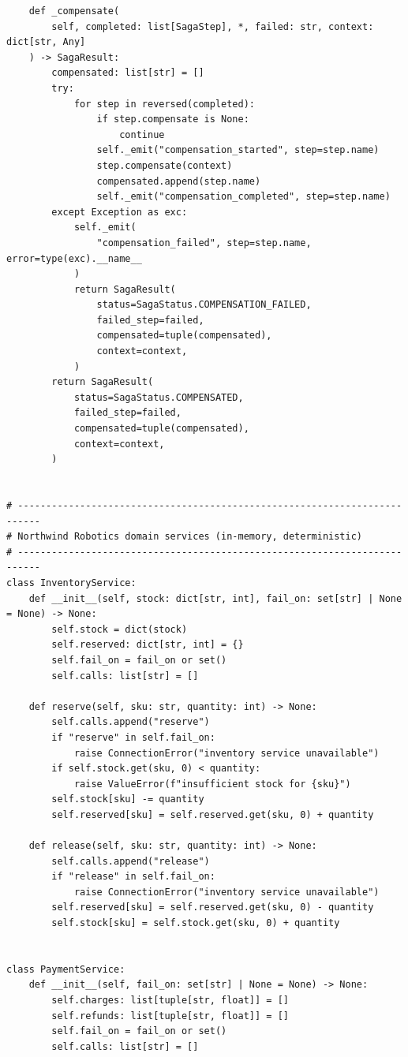 \begin{verbatim}
    def _compensate(
        self, completed: list[SagaStep], *, failed: str, context: dict[str, Any]
    ) -> SagaResult:
        compensated: list[str] = []
        try:
            for step in reversed(completed):
                if step.compensate is None:
                    continue
                self._emit("compensation_started", step=step.name)
                step.compensate(context)
                compensated.append(step.name)
                self._emit("compensation_completed", step=step.name)
        except Exception as exc:
            self._emit(
                "compensation_failed", step=step.name, error=type(exc).__name__
            )
            return SagaResult(
                status=SagaStatus.COMPENSATION_FAILED,
                failed_step=failed,
                compensated=tuple(compensated),
                context=context,
            )
        return SagaResult(
            status=SagaStatus.COMPENSATED,
            failed_step=failed,
            compensated=tuple(compensated),
            context=context,
        )


# --------------------------------------------------------------------------
# Northwind Robotics domain services (in-memory, deterministic)
# --------------------------------------------------------------------------
class InventoryService:
    def __init__(self, stock: dict[str, int], fail_on: set[str] | None = None) -> None:
        self.stock = dict(stock)
        self.reserved: dict[str, int] = {}
        self.fail_on = fail_on or set()
        self.calls: list[str] = []

    def reserve(self, sku: str, quantity: int) -> None:
        self.calls.append("reserve")
        if "reserve" in self.fail_on:
            raise ConnectionError("inventory service unavailable")
        if self.stock.get(sku, 0) < quantity:
            raise ValueError(f"insufficient stock for {sku}")
        self.stock[sku] -= quantity
        self.reserved[sku] = self.reserved.get(sku, 0) + quantity

    def release(self, sku: str, quantity: int) -> None:
        self.calls.append("release")
        if "release" in self.fail_on:
            raise ConnectionError("inventory service unavailable")
        self.reserved[sku] = self.reserved.get(sku, 0) - quantity
        self.stock[sku] = self.stock.get(sku, 0) + quantity


class PaymentService:
    def __init__(self, fail_on: set[str] | None = None) -> None:
        self.charges: list[tuple[str, float]] = []
        self.refunds: list[tuple[str, float]] = []
        self.fail_on = fail_on or set()
        self.calls: list[str] = []


\end{verbatim}
